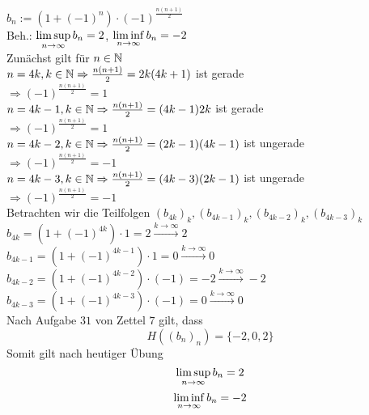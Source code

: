 \documentclass[../ana1u.tex]{subfiles}
\begin{document}
\begin{bsp}
    \(b_n := (1 + (-1)^n) \cdot (-1)^{\frac{n(n+1)}{2}} \)\\
    Beh.: \(\limsup\limits_{n\rightarrow\infty} b_n = 2\), \(\liminf\limits_{n\rightarrow\infty} b_n = -2\)\\
    Zunächst gilt für \(n \in \mathbb{N}\)\\
    \(n = 4k, k \in \mathbb{N} \Rightarrow \frac{n(n+1)}{2} = 2k(4k+1)\) ist gerade\\
    \(\Rightarrow (-1)^{\frac{n(n+1)}{2}} = 1\)\\
    \(n = 4k - 1, k \in \mathbb{N} \Rightarrow \frac{n(n+1)}{2} = (4k-1)2k\) ist gerade\\
    \(\Rightarrow (-1)^{\frac{n(n+1)}{2}} = 1\)\\
    \(n = 4k - 2, k \in \mathbb{N} \Rightarrow \frac{n(n+1)}{2} = (2k-1)(4k-1)\) ist ungerade\\
    \(\Rightarrow (-1)^{\frac{n(n+1)}{2}} = -1\)\\
    \(n = 4k - 3, k \in \mathbb{N} \Rightarrow \frac{n(n+1)}{2} = (4k-3)(2k-1)\) ist ungerade\\
    \(\Rightarrow (-1)^{\frac{n(n+1)}{2}} = -1\)\\
    Betrachten wir die Teilfolgen \((b_{4k})_k, (b_{4k-1})_k, (b_{4k-2})_k, (b_{4k-3})_k\)\\
    \(b_{4k} = (1 + (-1)^{4k}) \cdot 1 = 2 \overset{k \rightarrow \infty}{\rightarrow} 2\)\\
    \(b_{4k-1} = (1 + (-1)^{4k-1}) \cdot 1 = 0 \overset{k \rightarrow \infty}{\rightarrow} 0\)\\
    \(b_{4k-2} = (1 + (-1)^{4k-2}) \cdot (-1) = -2 \overset{k \rightarrow \infty}{\rightarrow} -2\)\\
    \(b_{4k-3} = (1 + (-1)^{4k-3}) \cdot (-1) = 0 \overset{k \rightarrow \infty}{\rightarrow} 0\)\\
    Nach Aufgabe \(31\) von Zettel \(7\) gilt, dass
    \[H((b_n)_n) = \{-2,0,2\}\]
    Somit gilt nach heutiger Übung\\
    \[\limsup\limits_{n\rightarrow\infty} b_n = 2\]
    \[\liminf\limits_{n\rightarrow\infty} b_n = -2\]
\end{bsp}
\end{document}
